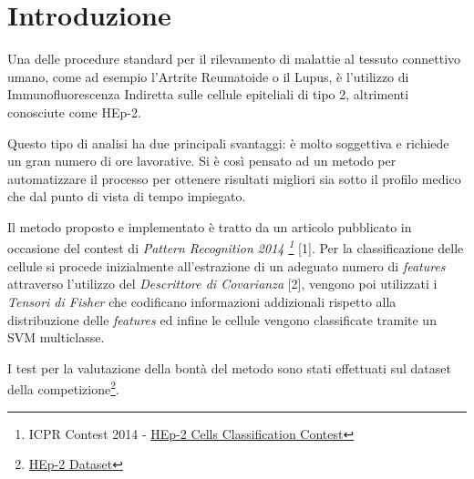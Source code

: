 \section{Introduzione}

Una delle procedure standard per il rilevamento di malattie al tessuto connettivo umano, come ad esempio l'Artrite Reumatoide o il Lupus, è l'utilizzo di Immunofluorescenza Indiretta sulle cellule epiteliali di tipo 2, altrimenti conosciute come HEp-2.

Questo tipo di analisi ha due principali svantaggi: è molto soggettiva e richiede un gran numero di ore lavorative. Si è così pensato ad un metodo per automatizzare il processo per ottenere risultati migliori sia sotto il profilo medico che dal punto di vista di tempo impiegato.

Il metodo proposto e implementato è tratto da un articolo pubblicato in occasione del contest di \emph{Pattern Recognition 2014 \footnote{ICPR Contest 2014 - \href{http://nerone.diem.unisa.it/hep2contest/description.shtml}{HEp-2 Cells Classification Contest}}} [1]. Per la classificazione delle cellule si procede inizialmente all'estrazione di un adeguato numero di \emph{features} attraverso l'utilizzo del \emph{Descrittore di Covarianza} [2], vengono poi utilizzati i \emph{Tensori di Fisher} che codificano informazioni addizionali rispetto alla distribuzione delle \emph{features} ed infine le cellule vengono classificate tramite un SVM multiclasse.

I test per la valutazione della bontà del metodo sono stati effettuati sul dataset della competizione\footnote{\href{http://mivia.unisa.it/datasets/biomedical-image-datasets/hep2-image-dataset/}{HEp-2 Dataset}}.
